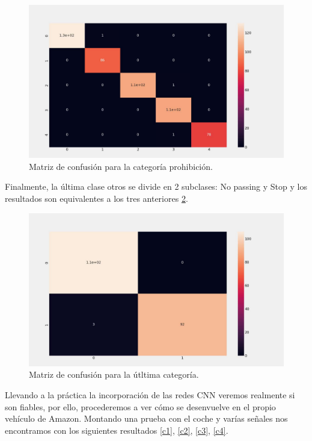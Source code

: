 \begin{figure}[H]
    \centering
 	\includegraphics[width=\textwidth]{Imagenes/IA/prohibicion_confusion.pdf}
    \caption{Matriz de confusión para la categoría prohibición.}
    \label{probconf}
\end{figure}

Finalmente, la última clase otros se divide en 2 subclases: No passing y Stop y los resultados son equivalentes a los tres anteriores \ref{otrosconf}.\\

\begin{figure}[H]
    \centering
 	\includegraphics[width=\textwidth]{Imagenes/IA/otros_confusion.pdf}
    \caption{Matriz de confusión para la útltima categoría.}
    \label{otrosconf}
\end{figure}


Llevando a la práctica la incorporación de las redes CNN veremos realmente si son fiables, por ello, procederemos a ver cómo se desenvuelve en el propio vehículo de Amazon. Montando una prueba con el coche y varías señales nos encontramos con los siguientes resultados \ref{c1}, \ref{c2}, \ref{c3}, \ref{c4}.\\


